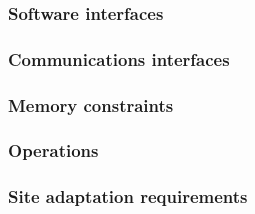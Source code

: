 \documentclass{article}
\begin{document}
\subsubsection{Software interfaces}


\subsubsection{Communications interfaces}

\subsubsection{Memory constraints}

\subsubsection{Operations}



\subsubsection{Site adaptation requirements}
\end{document}
